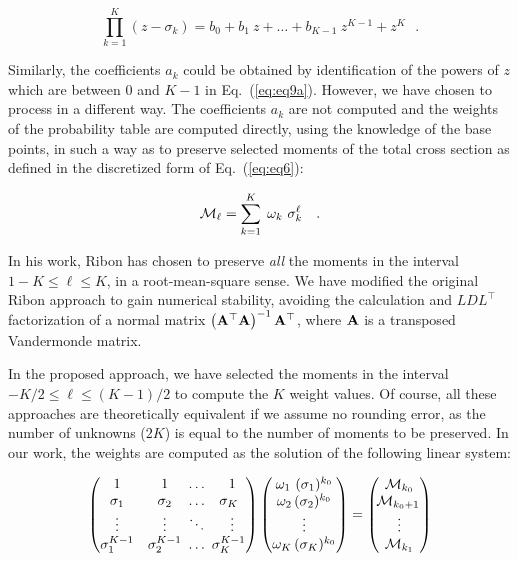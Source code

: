 \begin{equation}
\prod_{k=1}^K (z-\sigma_k)=b_0+b_1 \ z+\ldots+b_{K-1} \ z^{K-1}+z^K \ \ \ .
\label{eq:eq11}
\end{equation}

\vskip 0.1cm

Similarly, the coefficients $a_k$ could be obtained by identification of the
powers of $z$ which are between $0$ and $K-1$ in Eq.~(\ref{eq:eq9a}). However,
we have chosen to process in a different way.
The coefficients $a_k$ are not computed and the weights of
the probability table are computed directly, using the knowledge of the
base points, in such a way as to preserve selected moments
of the total cross section as defined in the discretized form of
Eq.~(\ref{eq:eq6}):

\begin{equation}
{\cal M}_\ell=\sum_{k=1}^{K}\; \omega_k \ \sigma_k^\ell \ \ \ .
\label{eq:eq11b}
\end{equation}

\vskip 0.1cm

In his work, Ribon has chosen to preserve {\sl all} the moments in the
interval $1-K\le \ell \le K$,
in a root-mean-square sense. We have modified the
original Ribon approach to gain numerical stability, avoiding the
calculation and $L D L^\top$ factorization of a normal matrix
$\left({\bf A}^\top{\bf A} \right)^{-1}{\bf A}^\top$, where ${\bf A}$ is a
transposed Vandermonde matrix.

\vskip 0.1cm

In the proposed approach, we have selected the moments in the interval
$-K/2\le \ell \le (K-1)/2$ to compute the $K$ weight values. Of course,
all these approaches are theoretically equivalent if we assume no rounding
error, as the number of unknowns ($2K$) is equal to the number of moments to
be preserved. In our work, the weights are computed as the solution
of the following linear system:

\begin{equation}
\left(\begin{matrix}   1 & 1 & \hspace{-0.5em}\ldots & 1 \cr
         \sigma_1 & \sigma_2 & \hspace{-0.5em}\ldots &
         \hspace{-0.5em}\sigma_K \cr
         \vdots   & \vdots   & \hspace{-0.5em}\ddots &
         \vdots   \cr
         \sigma_1^{K-1} &  \sigma_2^{K-1} & \hspace{-0.5em}\ldots
         & \hspace{-0.5em}\sigma_K^{K-1}\end{matrix}\right)
\left(\begin{matrix} \omega_1 \ (\sigma_1)^{k_0}\cr \omega_2 \,
(\sigma_2)^{k_0}\cr \vdots \cr \omega_K \, (\sigma_K)^{k_0}\end{matrix}\right)=
\left(\begin{matrix} {\cal M}_{k_0}\cr \hspace{-0.2em}{\cal M}_{k_0+1}\cr
\vdots \cr {\cal M}_{k_1}\end{matrix}\right)
\label{eq:eq12}
\end{equation}

